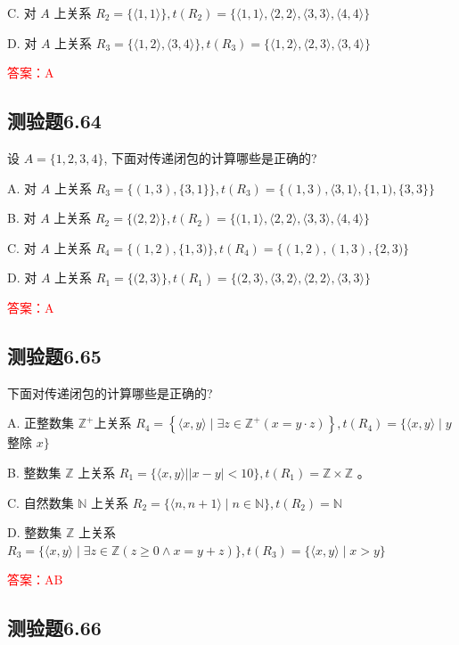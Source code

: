 \documentclass[UTF8, heading=true]{ctexart}
\begin{document}
C. 对 $A$ 上关系 $R_2=\{\langle 1,1\rangle\}, t\left(R_2\right)=\{\langle 1,1\rangle,\langle 2,2\rangle,\langle 3,3\rangle,\langle 4,4\rangle\}$

D. 对 $A$ 上关系 $R_3=\{\langle 1,2\rangle,\langle 3,4\rangle\}, t\left(R_3\right)=\{\langle 1,2\rangle,\langle 2,3\rangle,\langle 3,4\rangle\}$

\textcolor{red}{答案：A}

\subsection{测验题6.64}

设 $A=\{1,2,3,4\}$, 下面对传递闭包的计算哪些是正确的?

A. 
对 $A$ 上关系 $R_3=\{(1,3),\{3,1\}\}, t\left(R_3\right)=\{(1,3),\langle 3,1\rangle,\{1,1),\{3,3\}\}$

B. 
对 $A$ 上关系 $R_2=\{(2,2\rangle\}, t\left(R_2\right)=\{(1,1\rangle,\langle 2,2\rangle,\langle 3,3\rangle,\langle 4,4\rangle\}$

C. 
对 $A$ 上关系 $R_4=\{(1,2),\{1,3)\}, t\left(R_4\right)=\{(1,2),(1,3),\{2,3)\}$

D. 
对 $A$ 上关系 $R_1=\{(2,3\rangle\}, t\left(R_1\right)=\{(2,3\rangle,\langle 3,2\rangle,\langle 2,2\rangle,\langle 3,3\rangle\}$

\textcolor{red}{答案：A}


\subsection{测验题6.65}
下面对传递闭包的计算哪些是正确的?

A. 正整数集 $\mathbb{Z}^{+}$上关系 $R_4=\left\{\langle x, y\rangle \mid \exists z \in \mathbb{Z}^{+}(x=y \cdot z)\right\}, t\left(R_4\right)=\{\langle x, y\rangle \mid y$ 整除 $x\}$

B. 整数集 $\mathbb{Z}$ 上关系 $R_1=\{\langle x, y\rangle| | x-y \mid<10\}, t\left(R_1\right)=\mathbb{Z} \times \mathbb{Z}$ 。

C. 自然数集 $\mathbb{N}$ 上关系 $R_2=\{\langle n, n+1\rangle \mid n \in \mathbb{N}\}, t\left(R_2\right)=\mathbb{N}$

D. 整数集 $\mathbb{Z}$ 上关系 $R_3=\{\langle x, y\rangle \mid \exists z \in \mathbb{Z}(z \geq 0 \wedge x=y+z)\}, t\left(R_3\right)=\{\langle x, y\rangle \mid x>y\}$

\textcolor{red}{答案：AB}

\subsection{测验题6.66}
\end{document}
